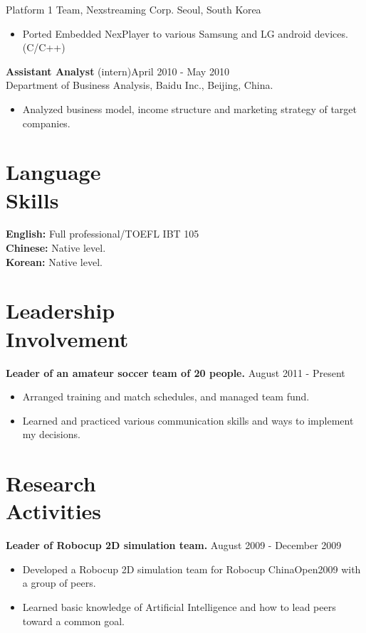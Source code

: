 \documentclass[margin]{res}
\begin{document}
\begin{resume}
				Platform 1 Team, Nexstreaming Corp. Seoul, South Korea
				\begin{itemize}  \itemsep -2pt %
				\item Ported Embedded NexPlayer to various Samsung and LG android devices.(C/C++)
				\end{itemize}
				
                {\bf Assistant Analyst} (intern)\hfill            April 2010 - May 2010 \\
                Department of Business Analysis, Baidu Inc., Beijing, China. 
                 \begin{itemize}  \itemsep -2pt %
                 \item Analyzed business model, income structure and marketing strategy of target companies.
                 \end{itemize} 

 \section{Language \\ Skills} 
				{\bf English:} Full professional/TOEFL IBT 105\\
				{\bf Chinese:} Native level.\\
				{\bf Korean: } Native level.	\\	 
 
 \section{Leadership \\ Involvement} 
				{ \bf Leader of an amateur soccer team of 20 people.} \hfill August 2011 - Present \\           
                 \begin{itemize}  \itemsep -2pt %
                 \item Arranged training and match schedules, and managed team fund. 
                \item  Learned and practiced various communication skills and ways to implement my decisions.
                \end{itemize}

\section{Research \\ Activities} 
				{ \bf Leader of Robocup 2D simulation team.} \hfill August 2009 - December 2009 \\  								
                 \begin{itemize}  \itemsep -2pt %
                 \item Developed a Robocup 2D simulation team for Robocup ChinaOpen2009 with a group of peers. 
                \item  Learned basic knowledge of Artificial Intelligence and how to lead peers toward a common goal.
                \end{itemize}


\end{resume}
\end{document}
